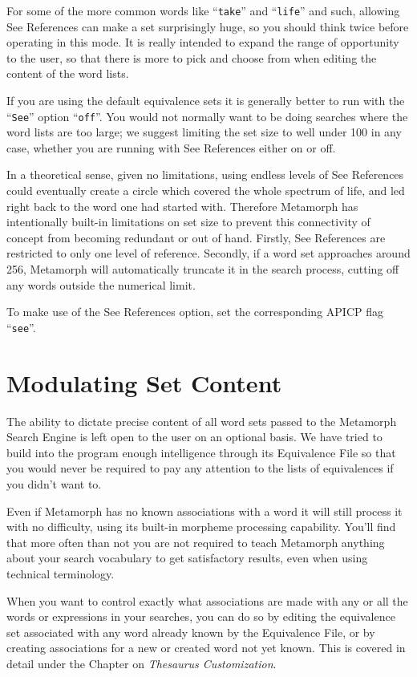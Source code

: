 For some of the more common words like ``\verb`take`'' and
``\verb`life`'' and such, allowing See References can make a set
surprisingly huge, so you should think twice before operating in this
mode.  It is really intended to expand the range of opportunity to the
user, so that there is more to pick and choose from when editing the
content of the word lists.

If you are using the default equivalence sets it is generally better
to run with the ``\verb`See`'' option ``\verb`off`''.  You would not
normally want to be doing searches where the word lists are too large;
we suggest limiting the set size to well under 100 in any case,
whether you are running with See References either on or off.

In a theoretical sense, given no limitations, using endless levels of
See References could eventually create a circle which covered the
whole spectrum of life, and led right back to the word one had started
with.  Therefore Metamorph has intentionally built-in limitations on
set size to prevent this connectivity of concept from becoming
redundant or out of hand.  Firstly, See References are restricted to
only one level of reference.  Secondly, if a word set approaches
around 256, Metamorph will automatically truncate it in the search
process, cutting off any words outside the numerical limit.

To make use of the See References option, set the corresponding
APICP flag ``\verb`see`''.

\section{Modulating Set Content}

The ability to dictate precise content of all word sets passed to the
Metamorph Search Engine is left open to the user on an optional basis.
We have tried to build into the program enough intelligence through
its Equivalence File so that you would never be required to pay any
attention to the lists of equivalences if you didn't want to.

Even if Metamorph has no known associations with a word it will still
process it with no difficulty, using its built-in morpheme processing
capability.  You'll find that more often than not you are not required
to teach Metamorph anything about your search vocabulary to get
satisfactory results, even when using technical terminology.

When you want to control exactly what associations are made with any
or all the words or expressions in your searches, you can do so by
editing the equivalence set associated with any word already known by
the Equivalence File, or by creating associations for a new or created
word not yet known.  This is covered in detail under the Chapter on
{\em Thesaurus Customization}.


